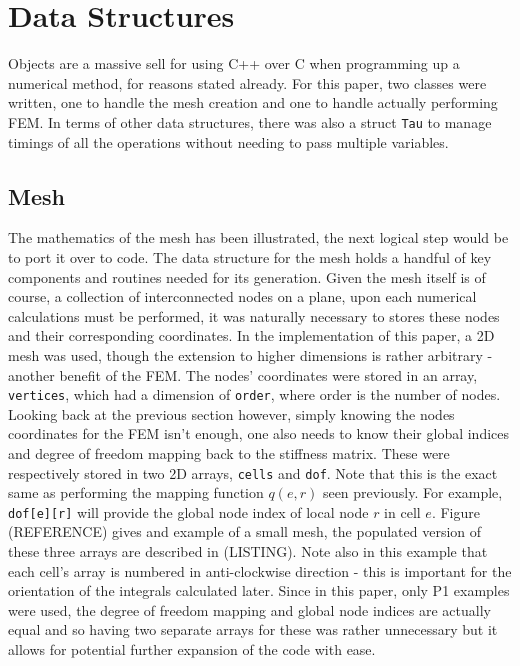 \section{Data Structures}

Objects are a massive sell for using C++ over C when programming up a numerical method, for reasons stated already. For this paper, two classes were written, one to handle the mesh creation and one to handle actually performing FEM. In terms of other data structures, there was also a struct \texttt{Tau} to manage timings of all the operations without needing to pass multiple variables.

\subsection{Mesh}

The mathematics of the mesh has been illustrated, the next logical step would be to port it over to code. The data structure for the mesh holds a handful of key components and routines needed for its generation. Given the mesh itself is of course, a collection of interconnected nodes on a plane, upon each numerical calculations must be performed, it was naturally necessary to stores these nodes and their corresponding coordinates. In the implementation of this paper, a 2D mesh was used, though the extension to higher dimensions is rather arbitrary - another benefit of the FEM. The nodes' coordinates were stored in an array, \texttt{vertices}, which had a dimension of \texttt{order}, where order is the number of nodes. Looking back at the previous section however, simply knowing the nodes coordinates for the FEM isn't enough, one also needs to know their global indices and degree of freedom mapping back to the stiffness matrix. These were respectively stored in two 2D arrays, \texttt{cells} and \texttt{dof}. Note that this is the exact same as performing the mapping function $q(e,r)$ seen previously. For example, \texttt{dof[e][r]} will provide the global node index of local node $r$ in cell $e$. Figure (REFERENCE) gives and example of a small mesh, the populated version of these three arrays are described in (LISTING). Note also in this example that each cell's array is numbered in anti-clockwise direction - this is important for the orientation of the integrals calculated later. Since in this paper, only P1 examples were used, the degree of freedom mapping and global node indices are actually equal and so having two separate arrays for these was rather unnecessary but it allows for potential further expansion of the code with ease.

